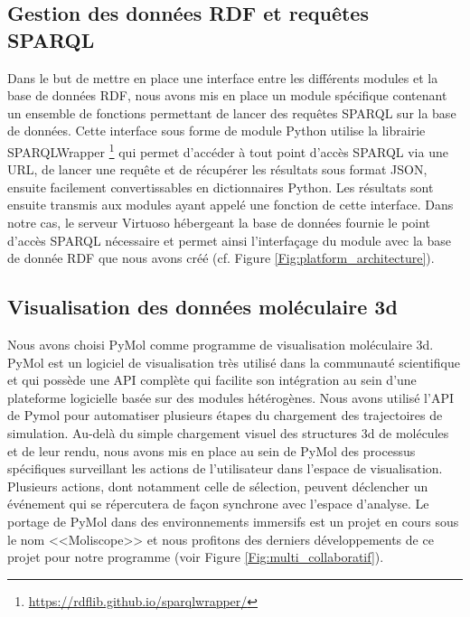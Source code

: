 \subsection{Gestion des données RDF et requêtes SPARQL}

Dans le but de mettre en place une interface entre les différents modules et la base de données RDF, nous avons mis en place un module spécifique contenant un ensemble de fonctions permettant de lancer des requêtes SPARQL sur la base de données. 
Cette interface sous forme de module Python utilise la librairie SPARQLWrapper \footnote{\url{https://rdflib.github.io/sparqlwrapper/}} qui permet d'accéder à tout point d'accès SPARQL via une URL, de lancer une requête et de récupérer les résultats sous format JSON, ensuite facilement convertissables en dictionnaires Python. Les résultats sont ensuite transmis aux modules ayant appelé une fonction de cette interface. Dans notre cas, le serveur Virtuoso hébergeant la base de données fournie le point d'accès SPARQL nécessaire et permet ainsi l'interfaçage du module avec la base de donnée RDF que nous avons créé (cf. Figure \ref{Fig:platform_architecture}).

\subsection{Visualisation des données moléculaire 3d}

Nous avons choisi PyMol \cite{delano_pymol_2002} comme programme de visualisation moléculaire 3d. PyMol est un logiciel de visualisation très utilisé dans la communauté scientifique et qui possède une API complète qui facilite son intégration au sein d'une plateforme logicielle basée sur des modules hétérogènes. 
Nous avons utilisé l'API de Pymol pour automatiser plusieurs étapes du chargement des trajectoires de simulation. Au-delà du simple chargement visuel des structures 3d de molécules et de leur rendu, nous avons mis en place au sein de PyMol des processus spécifiques surveillant les actions de l'utilisateur dans l'espace de visualisation. 
Plusieurs actions, dont notamment celle de sélection, peuvent déclencher un événement qui se répercutera de façon synchrone avec l'espace d'analyse. Le portage de PyMol dans des environnements immersifs est un projet en cours sous le nom <<Moliscope>> et nous profitons des derniers développements de ce projet pour notre programme (voir Figure \ref{Fig:multi_collaboratif}).

